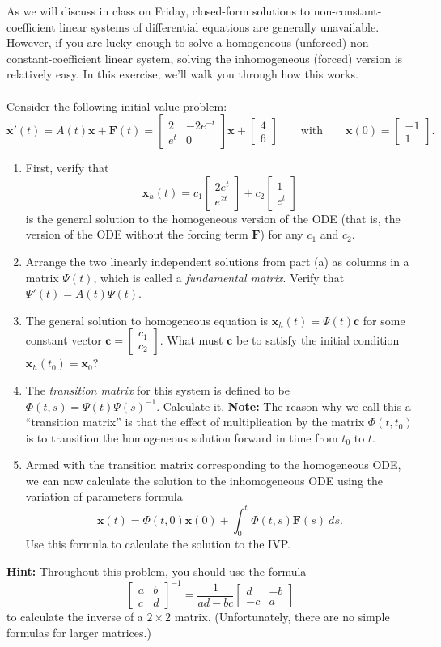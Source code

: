 \documentclass[12pt,letterpaper]{hmcpset}
\newcommand{\m}[1]{\begin{bmatrix} #1 \end{bmatrix}}
\newcommand{\f}[2]{\frac{#1}{#2}}
\renewcommand{\bf}[1]{\mathbf{#1}}
\begin{document}
\begin{problem}[3]
    As we will discuss in class on Friday, closed-form solutions to
    non-constant-coefficient linear systems of differential equations
    are generally unavailable.  However, if you are lucky enough to
    solve a homogeneous (unforced) non-constant-coefficient linear
    system, solving the inhomogeneous (forced) version is relatively
    easy.  In this exercise, we'll walk you through how this works.\\\\
    Consider the following initial value problem:
    \[
        \bf{x}'(t)=A(t)\bf{x}+\bf{F}(t)=\m{2&-2e^{-t}\\e^{t}&0}\bf{x}
        +\m{4\\6}\qquad\text{with}\qquad\bf{x}(0)=\m{-1\\1}.
    \]
    \begin{enumerate}
        \item First, verify that
            \[
                \bf{x}_h(t)=c_1\m{2e^{t}\\e^{2t}}+c_2\m{1\\e^{t}}
            \]
            is the general solution to the homogeneous version of the ODE
            (that is, the version of the ODE without the forcing term
            $\bf{F}$) for any $c_1$ and $c_2$.
        \item Arrange the two linearly independent solutions from part
            (a) as columns in a matrix $\Psi(t)$, which is called a
            \textit{fundamental matrix}. Verify that
            $\Psi'(t)=A(t)\Psi(t)$.
        \item The general solution to homogeneous equation is
            $\bf{x}_h(t)=\Psi(t)\bf{c}$ for some constant vector
            $\bf{c}=\m{c_1\\c_2}$. What must $\bf{c}$ be to satisfy the
            initial condition $\bf{x}_h(t_0)=\bf{x}_0$?
        \item The \textit{transition matrix} for this system is
            defined to be $\Phi(t,s)=\Psi(t)\Psi(s)^{-1}$. Calculate it.
            \textbf{Note:} The reason why we call this a ``transition
            matrix'' is that the effect of multiplication by the
            matrix $\Phi(t,t_0)$ is to transition the homogeneous
            solution forward in time from $t_0$ to $t$.
        \item Armed with the transition matrix corresponding to the
            homogeneous ODE, we can now calculate the solution to the
            inhomogeneous ODE using the variation of parameters formula
            \[
                \bf{x}(t)=\Phi(t,0)\bf{x}(0)
                +\int_{0}^{t}\Phi(t,s)\bf{F}(s)~ds.
            \]
            Use this formula to calculate the solution to the IVP.
    \end{enumerate}
    \textbf{Hint:} Throughout this problem, you should use the formula
    \[
        \m{a&b\\c&d}^{-1}=\f{1}{ad-bc}\m{d&-b\\-c&a}
    \]
    to calculate the inverse of a $2\times2$ matrix. (Unfortunately,
    there are no simple formulas for larger matrices.)
\end{problem}
\end{document}
